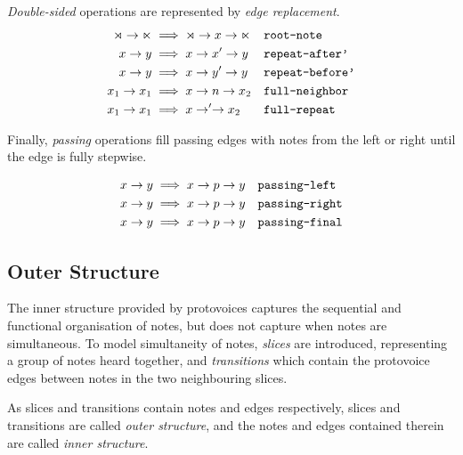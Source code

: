 \documentclass[12pt,a4paper,twoside,openright]{report} \usepackage[pdfborder={0 0 0}]{hyperref}    %
\theoremstyle{definition} \newtheorem{definition}{Definition}[section]
\begin{document}
  \textit{Double-sided} operations are represented by \textit{edge replacement}. \begin{equation} \begin{aligned}
    \rtimes \to \ltimes &\implies \rtimes \to x \to \ltimes && \text{\texttt{root-note}} \label{eq:rootNote} \\ x \to
    y &\implies x \to x' \to y && \text{\texttt{repeat-after'}} \label{eq:repeatAfter'}\\ x \to y &\implies x \to y' \to
    y && \text{\texttt{repeat-before'}} \label{eq:repeatBefore'}\\ x_1 \to x_1 &\implies x \to n \to x_2 &&
  \text{\texttt{full-neighbor}} \label{eq:full-neighbor}\\ x_1 \to x_1 &\implies x \to ' \to x_2 &&
\text{\texttt{full-repeat}} \label{eq:full-repeat}\\ \end{aligned} 
\label{eq:doublesidedinnerop} \end{equation}

Finally, \textit{passing} operations fill passing edges with notes from the left or right until the edge is fully
stepwise.

\begin{equation} \begin{aligned} x \to y &\implies x \to p \to y && \text{\texttt{passing-left}}
\label{eq:passing-left}\\ x \to y &\implies x \to p \to y && \text{\texttt{passing-right}} \label{eq:passing-right}\\
x \to y &\implies x \to p \to y && \text{\texttt{passing-final}} \label{eq:passing-final}\\ \end{aligned} \end{equation}
\subsection{Outer Structure} \label{sub:Outer Structure}

The inner structure provided by protovoices captures the sequential and functional organisation of notes, but does not
capture when notes are simultaneous. To model simultaneity of notes, \textit{slices} are introduced, representing
a group of notes heard together, and \textit{transitions} which contain the protovoice edges between notes in the two
neighbouring slices. 
\par As slices and transitions contain notes and edges respectively, slices and transitions are called \textit{outer
structure}, and the notes and edges contained therein are called \textit{inner structure}.
\end{document}
